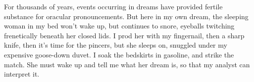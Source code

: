 
For thousands of years, events occurring in dreams have provided fertile
substance for oracular pronouncements. But here in my own dream, the
sleeping woman in my bed won't wake up, but continues to snore, eyeballs
twitching frenetically beneath her closed lids. I prod her with my
fingernail, then a sharp knife, then it's time for the pincers, but she
sleeps on, snuggled under my expensive goose-down duvet. I soak the
bedskirts in gasoline, and strike the match. She must wake up and tell
me what her dream is, so that my analyst can interpret it.

